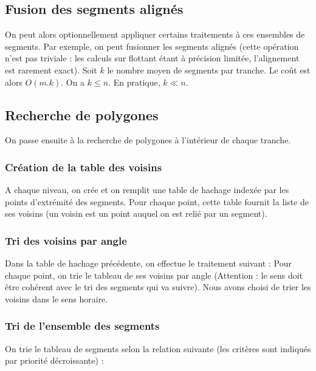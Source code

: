 \documentclass{article}
\begin{document}

\subsection{Fusion des segments alignés}

On peut alors optionnellement appliquer certains traitements à ces ensembles de segments. Par exemple, on peut fusionner les segments alignés (cette opération n'est pas triviale : les calculs sur flottant étant à précision limitée, l'alignement est rarement exact). Soit $k$ le nombre moyen de segments par tranche. Le coût est alors $O(m.k)$. On a $k \leq n$. En pratique, $k \ll n$.

\subsection{Recherche de polygones}

On passe ensuite à la recherche de polygones à l'intérieur de chaque tranche.

\subsubsection{Création de la table des voisins}

A chaque niveau, on crée et on remplit une table de hachage indexée par les points d’extrémité des segments. Pour chaque point, cette table fournit la liste de ses voisins (un voisin est un point auquel on est relié par un segment).

\subsubsection{Tri des voisins par angle}

Dans la table de hachage précédente, on effectue le traitement suivant :
Pour chaque point, on trie le tableau de ses voisins par angle (Attention : le sens doit être cohérent avec le tri des segments qui va suivre). Nous avons choisi de trier les voisins dans le sens horaire.

\subsubsection{Tri de l'ensemble des segments}

On trie le tableau de segments selon la relation suivante (les critères sont indiqués par priorité décroissante) :
\end{document}
